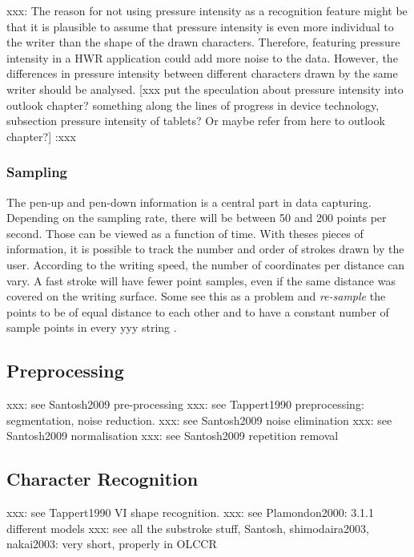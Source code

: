 xxx: 
The reason for not using pressure intensity as a recognition feature might be 
that it is plausible to assume that pressure intensity is even more individual 
to the writer than the shape of the drawn characters. 
Therefore, featuring pressure intensity in a HWR application could add more 
noise to the data. However, the differences in pressure intensity 
between different characters drawn by the same writer should be analysed.
[xxx put the speculation about pressure intensity into outlook chapter? 
something along the lines of progress in device technology, 
subsection pressure intensity of tablets? Or maybe refer from here to
outlook chapter?] 
:xxx

\subsubsection{Sampling}
\label{sec:sampling}

The pen-up and pen-down information is a central part in data capturing. 
Depending on the sampling rate, there will be between 50 and 200 points per 
second. Those can be viewed as a function of time.
With theses pieces of information, it is possible to track the number and order
of strokes drawn by the user. According to the writing speed, the number of 
coordinates per distance can vary. A fast stroke will have fewer point samples,
even if the same distance was covered on the writing surface.
Some see this as a problem and \emph{re-sample} the points to be of equal 
distance to each other and to have a constant number of sample points in every yyy
string . 



\subsection{Preprocessing}
\label{sec:preprocessing}

xxx: see Santosh2009 pre-processing
xxx: see Tappert1990 preprocessing: segmentation, noise reduction.
xxx: see Santosh2009 noise elimination
xxx: see Santosh2009 normalisation
xxx: see Santosh2009 repetition removal

\subsection{Character Recognition}
\label{sec:characterrecognition}

xxx: see Tappert1990 VI shape recognition.
xxx: see Plamondon2000: 3.1.1 different models
xxx: see all the substroke stuff, Santosh, shimodaira2003, nakai2003: very short, properly in OLCCR

